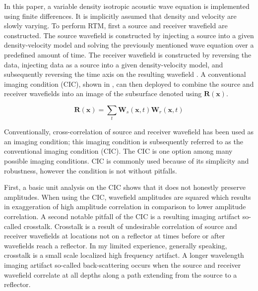 In this paper, a variable density isotropic acoustic wave equation is implemented using finite differences.  It is implicitly assumed that density and velocity are slowly varying.  To perform RTM, first a source and receiver wavefield are constructed.  The source wavefield is constructed by injecting a source into a given density-velocity model and solving the previously mentioned wave equation over a predefined amount of time.  The receiver wavefield is constructed by reversing the data, injecting data as a source into a given density-velocity model, and subsequently reversing the time axis on the resulting wavefield \cite[]{baysal1983reverse}.  A conventional imaging condition (CIC), shown in , can then deployed to combine the source and receiver wavefields into an image of the subsurface denoted using $\mathbf{R}(\mathbf{x})$.  

\begin{equation} \label{eqn:cic}
\mathbf{R}(\mathbf{x})=\sum_t {\mathbf{W}_s(\mathbf{x},t)\mathbf{W}_r(\mathbf{x},t)}
\end{equation}




Conventionally, cross-correlation of source and receiver wavefield has been used as an imaging condition; this imaging condition is subsequently referred to as the conventional imaging condition (CIC).  The CIC is one option among many possible imaging conditions.  CIC is commonly used because of its simplicity and robustness, however the condition is not without pitfalls.  

First, a basic unit analysis on the CIC shows that it does not honestly preserve amplitudes.  When using the CIC, wavefield amplitudes are squared which results in exaggeration of high amplitude correlation in comparison to lower amplitude correlation.  A second notable pitfall of the CIC is a resulting imaging artifact so-called crosstalk.  Crosstalk is a result of undesirable correlation of source and receiver wavefields at locations not on a reflector at times before or after wavefields reach a reflector.  In my limited experience, generally speaking, crosstalk is a small scale localized high frequency artifact. A longer wavelength imaging artifact so-called back-scattering occurs when the source and receiver wavefield correlate at all depths along a path extending from the source to a reflector.

